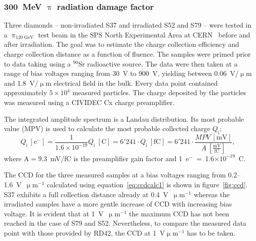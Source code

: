 
\subsubsection{300~MeV $\uppi$ radiation damage factor}
Three diamonds -- non-irradiated S37 and irradiated S52 and S79 -- were tested in a $\uppi_\mathrm{120~GeV}$ test beam in the SPS North Experimental Area at CERN~\cite{Brianti:604383} before and after irradiation. The goal was to estimate the charge collection efficiency and charge collection distance as a function of fluence. The samples were primed prior to data taking using a $^{90}$Sr radioactive source. The data were then taken at a range of bias voltages ranging from 30~V to 900~V, yielding between 0.06~V/$\upmu$m and 1.8~V/$\upmu$m electrical field in the bulk. Every data point contained approximately $5\times10^4$ measured particles. The charge deposited by the particles was measured using a CIVIDEC Cx charge preamplifier. 

The integrated amplitude spectrum is a Landau distribution. Its most probable value (MPV) is used to calculate the most probable collected charge $Q_\mathrm{i}$:
\begin{equation}
\label{eq:ccdcalc}
Q_\mathrm{i}~[\mathrm{e}^-] 
= \frac{1} {1.6\times 10^{-19}} Q_\mathrm{i}~[\mathrm{C}] 
= 6'241 \cdot Q_\mathrm{i}~[\mathrm{fC}] 
= 6'241 \cdot \frac{MPV~[\mathrm{mV}]}{A~[\frac{\mathrm{mV}}{\mathrm{fC}}]}
,
\end{equation} 
where A$=9.3$~mV/fC is the preamplifier gain factor and 1~e$^-$~=~1.6$\times10^{-19}$~C. 

The CCD for the three measured samples at a bias voltages ranging from 0.2--1.6~V~$\upmu$m$^{-1}$ calculated using equation~\ref{eq:ccdcalc1} is shown in figure~\ref{fig:ccd}. S37 exhibits a full collection distance already at 0.4~V~$\upmu$m$^{-1}$ whereas the irradiated samples have a more gentle increase of CCD with increasing bias voltage. It is evident that at 1~V~$\upmu$m$^{-1}$  the maximum CCD has not been reached in the case of S79 and S52. Nevertheless, to compare the measured data point with those provided by RD42, the CCD at 1~V$\upmu$m$^{-1}$ has to be taken.

